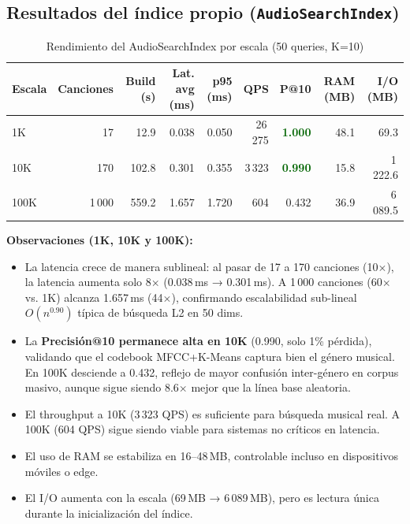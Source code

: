 \documentclass[12pt,a4paper]{article}
\newcommand{\win}[1]{\textcolor{darkgreen}{\textbf{#1}}}
\begin{document}
\subsection{Resultados del índice propio (\texttt{AudioSearchIndex})}

\begin{table}[H]
  \centering
  \caption{Rendimiento del AudioSearchIndex por escala (50 queries, K=10)}
  \begin{tabular}{lrrrrrrrr}
    \toprule
    \textbf{Escala} & \textbf{Canciones} & \textbf{Build (s)} &
    \textbf{Lat. avg (ms)} & \textbf{p95 (ms)} & \textbf{QPS} &
    \textbf{P@10} & \textbf{RAM (MB)} & \textbf{I/O (MB)} \\
    \midrule
    1K   & 17    & 12.9  & 0.038 & 0.050 & 26\,275 & \win{1.000} & 48.1  & 69.3 \\
    10K  & 170   & 102.8 & 0.301 & 0.355 & 3\,323  & \win{0.990} & 15.8  & 1\,222.6 \\
    100K  & 1\,000 & 559.2 & 1.657 & 1.720 & 604    & 0.432      & 36.9  & 6\,089.5 \\
    \bottomrule
  \end{tabular}
  \label{tab:audio-custom}
\end{table}

\noindent\textbf{Observaciones (1K, 10K y 100K):}
\begin{itemize}
  \item La latencia crece de manera sublineal: al pasar de 17 a 170 canciones
        (10$\times$), la latencia aumenta solo 8$\times$ (0.038\,ms → 0.301\,ms).
        A 1\,000 canciones (60$\times$ vs. 1K) alcanza 1.657\,ms (44$\times$),
        confirmando escalabilidad sub-lineal $O(n^{0.90})$ típica de búsqueda L2 en 50 dims.
  \item La \textbf{Precisión@10 permanece alta en 10K} (0.990, solo 1\% pérdida),
        validando que el codebook MFCC+K-Means captura bien el género musical.
        En 100K desciende a 0.432, reflejo de mayor confusión inter-género
        en corpus masivo, aunque sigue siendo 8.6$\times$ mejor que la línea base aleatoria.
  \item El throughput a 10K (3\,323 QPS) es suficiente para búsqueda musical
        real. A 100K (604 QPS) sigue siendo viable para sistemas no críticos en latencia.
  \item El uso de RAM se estabiliza en 16--48\,MB, controlable incluso en
        dispositivos móviles o edge.
  \item El I/O aumenta con la escala (69\,MB → 6\,089\,MB), pero es lectura única
        durante la inicialización del índice.
\end{itemize}
\end{document}
